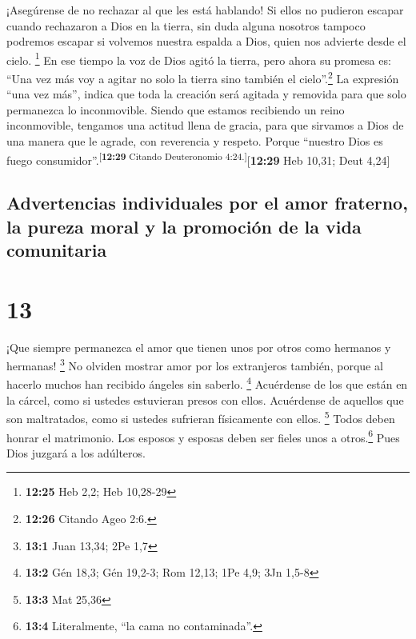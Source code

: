  ¡Asegúrense de no rechazar al que les está hablando! Si
ellos no pudieron escapar cuando rechazaron a Dios en la tierra, sin
duda alguna nosotros tampoco podremos escapar si volvemos nuestra
espalda a Dios, quien nos advierte desde el cielo. \footnote{\textbf{12:25}
  Heb 2,2; Heb 10,28-29}  En ese tiempo la voz de Dios
agitó la tierra, pero ahora su promesa es: ``Una vez más voy a agitar no
solo la tierra sino también el cielo''.\footnote{\textbf{12:26} Citando
  Ageo 2:6.}  La expresión ``una vez más'', indica que
toda la creación será agitada y removida para que solo permanezca lo
inconmovible.  Siendo que estamos recibiendo un reino
inconmovible, tengamos una actitud llena de gracia, para que sirvamos a
Dios de una manera que le agrade, con reverencia y respeto.
 Porque ``nuestro Dios es fuego
consumidor''.\textsuperscript{{[}\textbf{12:29} Citando Deuteronomio
4:24.{]}}{[}\textbf{12:29} Heb 10,31; Deut 4,24{]}

\hypertarget{advertencias-individuales-por-el-amor-fraterno-la-pureza-moral-y-la-promociuxf3n-de-la-vida-comunitaria}{%
\subsection{Advertencias individuales por el amor fraterno, la pureza
moral y la promoción de la vida
comunitaria}\label{advertencias-individuales-por-el-amor-fraterno-la-pureza-moral-y-la-promociuxf3n-de-la-vida-comunitaria}}

\hypertarget{section-12}{%
\section{13}\label{section-12}}

 ¡Que siempre permanezca el amor que tienen unos por otros
como hermanos y hermanas! \footnote{\textbf{13:1} Juan 13,34; 2Pe 1,7}
 No olviden mostrar amor por los extranjeros también,
porque al hacerlo muchos han recibido ángeles sin saberlo. \footnote{\textbf{13:2}
  Gén 18,3; Gén 19,2-3; Rom 12,13; 1Pe 4,9; 3Jn 1,5-8} 
Acuérdense de los que están en la cárcel, como si ustedes estuvieran
presos con ellos. Acuérdense de aquellos que son maltratados, como si
ustedes sufrieran físicamente con ellos. \footnote{\textbf{13:3} Mat
  25,36}  Todos deben honrar el matrimonio. Los esposos y
esposas deben ser fieles unos a otros.\footnote{\textbf{13:4}
  Literalmente, ``la cama no contaminada''.} Pues Dios juzgará a los
adúlteros.

